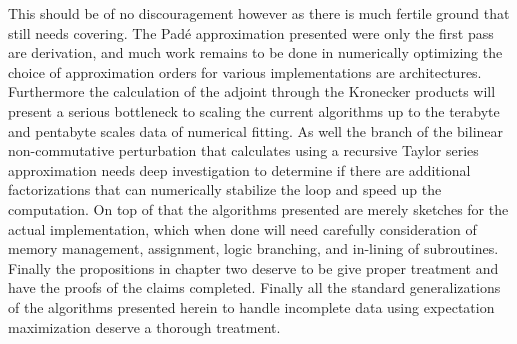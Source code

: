This should be of no discouragement however as there is much fertile ground that still needs
covering. The Pad\'{e} approximation presented were only the first pass are derivation, and
much work remains to be done in numerically optimizing the choice of approximation orders
for various implementations are architectures. Furthermore the calculation of the adjoint
through the Kronecker products will present a serious bottleneck to scaling the current
algorithms up to the terabyte and pentabyte scales data of numerical fitting. As well the 
branch of the bilinear non-commutative perturbation that calculates using a recursive Taylor
series approximation needs deep investigation to determine if there are additional
factorizations that can numerically stabilize the loop and speed up the computation. On top
of that the algorithms presented are merely sketches for the actual implementation, which
when done will need carefully consideration of memory management, assignment, logic 
branching, and in-lining of subroutines. Finally the propositions in chapter two deserve to 
be give proper treatment and have the proofs of the claims completed. Finally all the 
standard generalizations of the algorithms presented herein to handle incomplete data using 
expectation maximization deserve a thorough treatment.